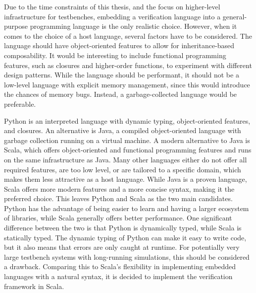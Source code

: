 Due to the time constraints of this thesis, and the focus on higher-level infrastructure for testbenches, embedding a
verification language into a general-purpose programming language is the only realistic choice. However, when it comes to the
choice of a host language, several factors have to be considered. The language should have object-oriented features
to allow for inheritance-based composability. It would be interesting to include functional programming features,
such as closures and higher-order functions, to experiment with different design patterns. While the
language should be performant, it should not be a low-level language with explicit memory management, since this
would introduce the chances of memory bugs. Instead, a garbage-collected language would be preferable.

Python is an interpreted language with dynamic typing, object-oriented features, and closures. An alternative is Java, a compiled
object-oriented language with garbage collection running on a virtual machine. A modern alternative to Java is Scala,
which offers object-oriented and functional programming features and runs on the same infrastructure as Java. Many
other languages either do not offer all required features, are too low level, or are tailored to a specific domain,
which makes them less attractive as a host language. While Java is a proven language, Scala offers more modern features
and a more concise syntax, making it the preferred choice. This leaves Python and Scala as the two main candidates.
Python has the advantage of being easier to learn and having a larger ecosystem of libraries, while Scala generally
offers better performance. One significant difference between the two is that Python is dynamically typed, while
Scala is statically typed. The dynamic typing of Python can make it easy to write code, but it also means that
errors are only caught at runtime. For potentially very large testbench systems with long-running
simulations, this should be considered a drawback. Comparing this to Scala's flexibility in implementing
embedded languages with a natural syntax, it is decided to implement the verification framework in Scala.

